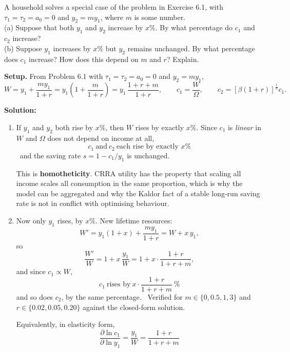 \documentclass[12pt, letterpaper]{article}
\newcommand{\pd}[2]{\dfrac{\partial #1}{\partial #2}}
\begin{document}
\begin{tcolorbox}[oddbox,title={Problem 6.9 \quad The Marginal Propensity to Consume in Proportional Terms}]
\begin{tcolorbox}[questionbox]
A household solves a special case of the problem in Exercise 6.1, with
$\tau_1=\tau_2=a_0=0$ and $y_2=my_1$, where $m$ is some number.\\[3pt]
(a) Suppose that both $y_1$ and $y_2$ increase by $x\%$. By what percentage do $c_1$ and
$c_2$ increase?\\[3pt]
(b) Suppose $y_1$ increases by $x\%$ but $y_2$ remains unchanged. By what percentage does
$c_1$ increase? How does this depend on $m$ and $r$? Explain.
\end{tcolorbox}

\textbf{Setup.} From Problem 6.1 with $\tau_1=\tau_2=a_0=0$ and $y_2=my_1$,
\[
W=y_1+\frac{my_1}{1+r}=y_1\left(1+\frac{m}{1+r}\right)
=y_1\,\frac{1+r+m}{1+r},
\qquad
c_1=\frac{W}{\Omega},
\qquad
c_2=\left[\beta(1+r)\right]^{\frac{1}{\sigma}}c_1 .
\]

\textbf{Solution:}
\begin{enumerate}

\item If $y_1$ and $y_2$ both rise by $x\%$, then $W$ rises by exactly $x\%$. Since $c_1$ is
\emph{linear} in $W$ and $\Omega$ does not depend on income at all,
\[
\boxed{\;c_1\ \text{and}\ c_2\ \text{each rise by exactly } x\%\;}
\]
\checkmark\ and the saving rate $s=1-c_1/y_1$ is unchanged.

\smallskip
This is \textbf{homotheticity}. CRRA utility has the property that scaling all income scales
all consumption in the same proportion, which is why the model can be aggregated and why the
Kaldor fact of a stable long-run saving rate is not in conflict with optimising behaviour.

\item Now only $y_1$ rises, by $x\%$. New lifetime resources:
\[
W'=y_1(1+x)+\frac{my_1}{1+r}
=W+x\,y_1 ,
\]
so
\[
\frac{W'}{W}=1+x\,\frac{y_1}{W}=1+x\cdot\frac{1+r}{1+r+m} ,
\]
and since $c_1\propto W$,
\[
\boxed{\;c_1\ \text{rises by}\ x\cdot\frac{1+r}{1+r+m}\ \%\;}
\]
and so does $c_2$, by the same percentage. \checkmark\ Verified for
$m\in\{0,0.5,1,3\}$ and $r\in\{0.02,0.05,0.20\}$ against the closed-form solution.

\smallskip
Equivalently, in elasticity form,
\[
\boxed{\;\pd{\ln c_1}{\ln y_1}=\frac{y_1}{W}=\frac{1+r}{1+r+m}\;}
\tag{6.9.1}
\]


\end{enumerate}
\end{tcolorbox}
\end{document}
